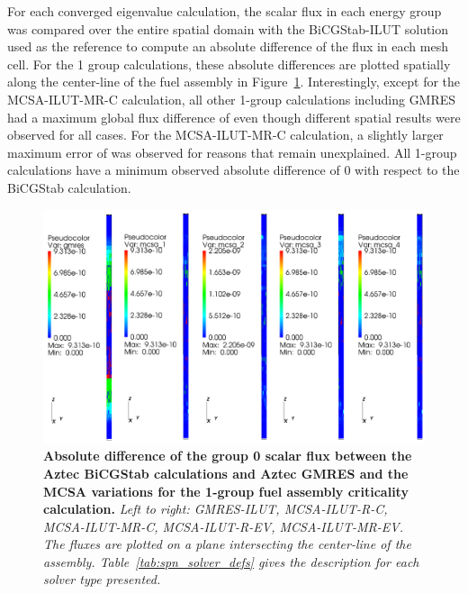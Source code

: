 For each converged eigenvalue calculation, the scalar flux in each
energy group was compared over the entire spatial domain with the
BiCGStab-ILUT solution used as the reference to compute an absolute
difference of the flux in each mesh cell. For the 1 group
calculations, these absolute differences are plotted spatially along
the center-line of the fuel assembly in
Figure~\ref{fig:serial_1_group_diff}. Interestingly, except for the
MCSA-ILUT-MR-C calculation, all other 1-group calculations including
GMRES had a maximum global flux difference of  even
though different spatial results were observed for all cases. For the
MCSA-ILUT-MR-C calculation, a slightly larger maximum error of
 was observed for reasons that remain unexplained. All
1-group calculations have a minimum observed absolute difference of 0
with respect to the BiCGStab calculation.

\begin{figure}[t!]
  \begin{center}
    \includegraphics[width=6in]{chapters/spn_equations/serial_1_group.pdf}
  \end{center}
  \caption{\textbf{Absolute difference of the group 0 scalar flux
      between the Aztec BiCGStab calculations and Aztec GMRES and the
      MCSA variations for the 1-group fuel assembly criticality
      calculation.} \textit{Left to right: GMRES-ILUT, MCSA-ILUT-R-C,
      MCSA-ILUT-MR-C, MCSA-ILUT-R-EV, MCSA-ILUT-MR-EV. The fluxes are
      plotted on a plane intersecting the center-line of the
      assembly. Table~\ref{tab:spn_solver_defs} gives the description
      for each solver type presented.}}
  \label{fig:serial_1_group_diff}
\end{figure}

